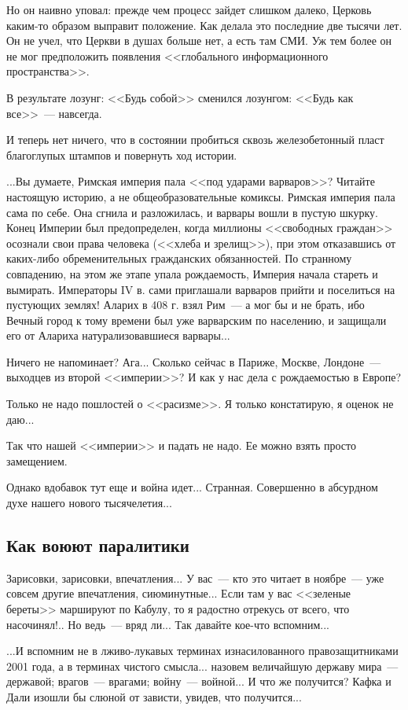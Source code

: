 \documentclass{scrbook}
\newcommand{\flqq}{<<}
\newcommand{\frqq}{>>}
\newcommand{\mdash}{~--- }
\newcommand{\essaysection}[1]{\subsection*{#1}\nopagebreak}
\begin{document}
Но он наивно уповал: прежде чем процесс зайдет слишком далеко, Церковь каким-то образом выправит положение. Как делала это последние две тысячи лет. Он не учел, что Церкви в душах больше нет, а есть там СМИ. Уж тем более он не мог предположить появления {\flqq}глобального информационного пространства{\frqq}.

В результате лозунг: {\flqq}Будь собой{\frqq} сменился лозунгом: {\flqq}Будь как все{\frqq}{\mdash}навсегда.

И теперь нет ничего, что в состоянии пробиться сквозь железобетонный пласт благоглупых штампов и повернуть ход истории.

...Вы думаете, Римская империя пала {\flqq}под ударами варваров{\frqq}? Читайте настоящую историю, а не общеобразовательные комиксы. Римская империя пала сама по себе. Она сгнила и разложилась, и варвары вошли в пустую шкурку. Конец Империи был предопределен, когда миллионы {\flqq}свободных граждан{\frqq} осознали свои права человека ({\flqq}хлеба и зрелищ{\frqq}), при этом отказавшись от каких-либо обременительных гражданских обязанностей. По странному совпадению, на этом же этапе упала рождаемость, Империя начала стареть и вымирать. Императоры IV в. сами приглашали варваров прийти и поселиться на пустующих землях! Аларих в 408 г. взял Рим{\mdash}а мог бы и не брать, ибо Вечный город к тому времени был уже варварским по населению, и защищали его от Алариха натурализовавшиеся варвары...

Ничего не напоминает? Ага... Сколько сейчас в Париже, Москве, Лондоне{\mdash}выходцев из второй {\flqq}империи{\frqq}? И как у нас дела с рождаемостью в Европе?

Только не надо пошлостей о {\flqq}расизме{\frqq}. Я только констатирую, я оценок не даю...

Так что нашей {\flqq}империи{\frqq} и падать не надо. Ее можно взять просто замещением.

Однако вдобавок тут еще и война идет... Странная. Совершенно в абсурдном духе нашего нового тысячелетия...

\essaysection{Как воюют паралитики}

Зарисовки, зарисовки, впечатления... У вас{\mdash}кто это читает в ноябре{\mdash}уже совсем другие впечатления, сиюминутные... Если там у вас {\flqq}зеленые береты{\frqq} маршируют по Кабулу, то я радостно отрекусь от всего, что насочинял!.. Но ведь{\mdash}вряд ли... Так давайте кое-что вспомним...

...И вспомним не в лживо-лукавых терминах изнасилованного правозащитниками 2001 года, а в терминах чистого смысла... назовем величайшую державу мира{\mdash}державой; врагов{\mdash}врагами; войну{\mdash}войной... И что же получится?
Кафка и Дали изошли бы слюной от зависти, увидев, что получится...
\end{document}
